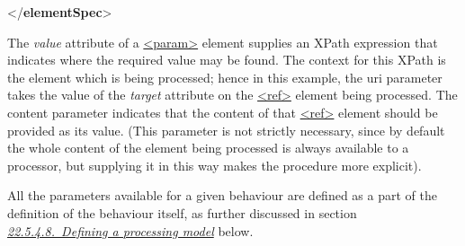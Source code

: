 \begin{shaded}
{</\textbf{elementSpec}>}\end{shaded}\egroup\par \noindent  The {\itshape value} attribute of a \hyperref[TEI.param]{<param>} element supplies an XPath expression that indicates where the required value may be found. The context for this XPath is the element which is being processed; hence in this example, the \textsf{uri} parameter takes the value of the {\itshape target} attribute on the \hyperref[TEI.ref]{<ref>} element being processed. The \textsf{content} parameter indicates that the content of that \hyperref[TEI.ref]{<ref>} element should be provided as its value. (This parameter is not strictly necessary, since by default the whole content of the element being processed is always available to a processor, but supplying it in this way makes the procedure more explicit).\par
All the parameters available for a given behaviour are defined as a part of the definition of the behaviour itself, as further discussed in section \textit{\hyperref[TDPMDEF]{22.5.4.8.\ Defining a processing model}} below.\par
